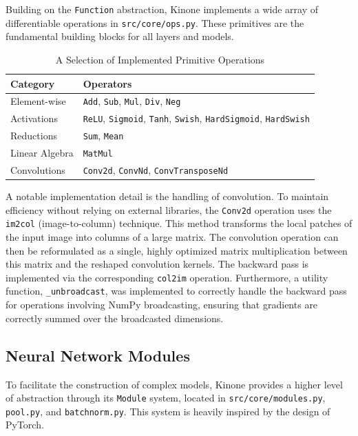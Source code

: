 \documentclass[a4paper]{article}
\begin{document}
Building on the \texttt{Function} abstraction, Kinone implements a wide array of differentiable operations in \texttt{src/core/ops.py}. These primitives are the fundamental building blocks for all layers and models.

\begin{table}[h!]
 \centering
 \caption{A Selection of Implemented Primitive Operations} \label{tab:ops}
 \begin{tabular}{|l|l|}
  \hline
  \textbf{Category} & \textbf{Operators} \\ \hline
  Element-wise & \texttt{Add}, \texttt{Sub}, \texttt{Mul}, \texttt{Div}, \texttt{Neg} \\
  Activations & \texttt{ReLU}, \texttt{Sigmoid}, \texttt{Tanh}, \texttt{Swish}, \texttt{HardSigmoid}, \texttt{HardSwish} \\
  Reductions & \texttt{Sum}, \texttt{Mean} \\
  Linear Algebra & \texttt{MatMul} \\
  Convolutions & \texttt{Conv2d}, \texttt{ConvNd}, \texttt{ConvTransposeNd} \\ \hline
 \end{tabular}
\end{table}

A notable implementation detail is the handling of convolution. To maintain efficiency without relying on external libraries, the \texttt{Conv2d} operation uses the \texttt{im2col} (image-to-column) technique. This method transforms the local patches of the input image into columns of a large matrix. The convolution operation can then be reformulated as a single, highly optimized matrix multiplication between this matrix and the reshaped convolution kernels. The backward pass is implemented via the corresponding \texttt{col2im} operation. Furthermore, a utility function, \texttt{\_unbroadcast}, was implemented to correctly handle the backward pass for operations involving NumPy broadcasting, ensuring that gradients are correctly summed over the broadcasted dimensions.

\subsection{Neural Network Modules}

To facilitate the construction of complex models, Kinone provides a higher level of abstraction through its \texttt{Module} system, located in \texttt{src/core/modules.py}, \texttt{pool.py}, and \texttt{batchnorm.py}. This system is heavily inspired by the design of PyTorch.
\end{document}
